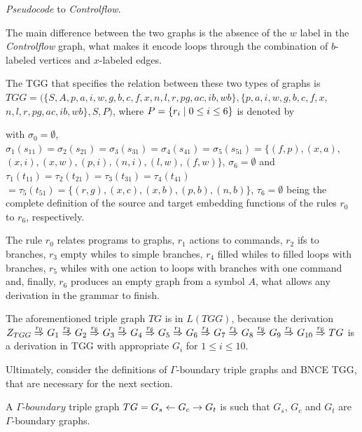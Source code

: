 \begin{example}{\emph{Pseudocode} to \emph{Controlflow}.}
	
	
	The main difference between the two graphs is the absence of the $w$ label in the \emph{Controlflow} graph, what makes it encode loops through the combination of $b$-labeled vertices and $x$-labeled edges.
	
	The TGG that specifies the relation between these two types of graphs is $TGG = (\{S, A, p, a, i, w, g, b, c, f, x, n, l, r, pg, ac, ib, wb\}, \{p, a, i, w, g, b, c, f, x,$ $ n, l, r, pg, ac, ib, wb\}, S, P)$, where $P = \{r_i \; | \; 0 \le i \le 6\}$ is denoted by
	
	
	
	with $\sigma_0 = \emptyset$, $\sigma_1(s_{11}) = \sigma_2(s_{21}) = \sigma_3(s_{31}) = \sigma_4(s_{41}) = \sigma_5(s_{51}) = \{ (f,p), (x,a), $ $(x,i), (x,w), (p,i), (n,i), (l,w), (f,w) \}$, $\sigma_6 = \emptyset$ and $\tau_1(t_{11}) = \tau_2(t_{21}) = \tau_3(t_{31}) = \tau_4(t_{41}) $ $= \tau_5(t_{51}) = \{ (r,g), (x,c), (x,b), (p,b), (n,b)\}$, $\tau_6 = \emptyset$ being the complete definition of the source and target embedding functions of the rules $r_0$ to $r_6$, respectively.
	
	The rule $r_0$ relates programs to graphs, $r_1$ actions to commands, $r_2$ ifs to branches, $r_3$ empty whiles to simple branches, $r_4$ filled whiles to filled loops with branches, $r_5$ whiles with one action to loops with branches with one command and, finally, $r_6$ produces an empty graph from a symbol $A$, what allows any derivation in the grammar to finish.
	
	The aforementioned triple graph $TG$ is in $L(TGG)$, because the derivation
	$
	\startTG{TGG} \tderiv{r_0}{}{} G_1 \tderiv{r_2}{}{} G_2 \tderiv{r_6}{}{} G_3 \tderiv{r_1}{}{} G_4 \tderiv{r_6}{}{} G_5 \tderiv{r_1}{}{} G_6 \tderiv{r_4}{}{} G_7 \tderiv{r_1}{}{} G_8 \tderiv{r_6}{}{} G_9 \tderiv{r_1}{}{} G_{10} \tderiv{r_6}{}{} TG
	$
	is a derivation in TGG with appropriate $G_i$ for $1 \le i \le 10$.
\end{example}


Ultimately, consider the definitions of $\Gamma\text{-boundary}$ triple graphs and BNCE TGG, that are necessary for the next section.

\begin{definition}
	A $\mathit{\Gamma\textit{-boundary}}$ triple graph $TG = G_s \overset{}{\leftarrow} G_c \overset{}{\rightarrow} G_t$ is such that $G_s$, $G_c$ and $G_t$ are $\Gamma\text{-boundary}$ graphs.
\end{definition}


